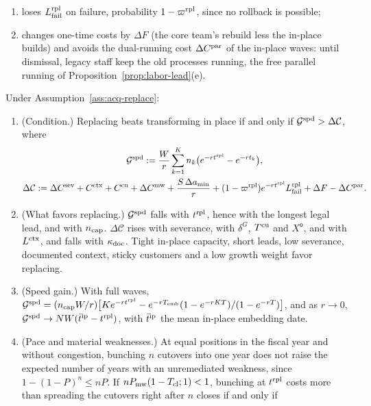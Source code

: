 \begin{assumption}[Replacement]
\begin{enumerate}
\item[(v)] loses $L^{\rm rpl}_{\rm fail}$ on failure, probability $1-\varpi^{\rm rpl}$, since no rollback is possible;
\item[(vi)] changes one-time costs by $\Delta F$ (the core team's rebuild less the in-place builds) and avoids the dual-running cost $\Delta C^{\rm par}$ of the in-place waves: until dismissal, legacy staff keep the old processes running, the free parallel running of Proposition~\ref{prop:labor-lead}(e).
\end{enumerate}
\end{assumption}

\begin{proposition}\label{prop:acq-replace}
Under Assumption~\ref{ass:acq-replace}:
\begin{enumerate}
\item[(a)] (Condition.) Replacing beats transforming in place if and only if $\mathcal G^{\rm spd}>\Delta\mathcal C$, where
\begin{equation}\label{eq:acq-replace}
\begin{gathered}
\mathcal G^{\rm spd}:=\frac Wr\sum_{k=1}^Kn_k\bigl(e^{-rt^{\rm rpl}}-e^{-rt_k}\bigr),\\
\Delta\mathcal C:=\Delta C^{\rm sev}+C^{\rm ctx}+C^{\rm cu}+\Delta C^{\rm mw}+\frac{S\,\Delta a_{\min}}r+(1-\varpi^{\rm rpl})e^{-rt^{\rm rpl}}L^{\rm rpl}_{\rm fail}+\Delta F-\Delta C^{\rm par}.
\end{gathered}
\end{equation}
\item[(b)] (What favors replacing.) $\mathcal G^{\rm spd}$ falls with $t^{\rm rpl}$, hence with the longest legal lead, and with $n_{\rm cap}$. $\Delta\mathcal C$ rises with severance, with $\delta^G$, $T^{\rm cu}$ and $X^{\mathsf o}$, and with $L^{\rm ctx}$, and falls with $\kappa_{\rm doc}$. Tight in-place capacity, short leads, low severance, documented context, sticky customers and a low growth weight favor replacing.
\item[(c)] (Speed gain.) With full waves, $\mathcal G^{\rm spd}=(n_{\rm cap}W/r)\bigl[Ke^{-rt^{\rm rpl}}-e^{-rT_{\rm emb}}(1-e^{-rKT})/(1-e^{-rT})\bigr]$, and as $r\to0$, $\mathcal G^{\rm spd}\to NW(\bar t^{\rm ip}-t^{\rm rpl})$, with $\bar t^{\rm ip}$ the mean in-place embedding date.
\item[(d)] (Pace and material weaknesses.) At equal positions in the fiscal year and without congestion, bunching $n$ cutovers into one year does not raise the expected number of years with an unremediated weakness, since $1-(1-P)^n\le nP$. If $nP_{\rm mw}(1-T_{\rm cl};1)<1$, bunching at $t^{\rm rpl}$ costs more than spreading the cutovers right after $n$ closes if and only if

\end{enumerate}
\end{proposition}
